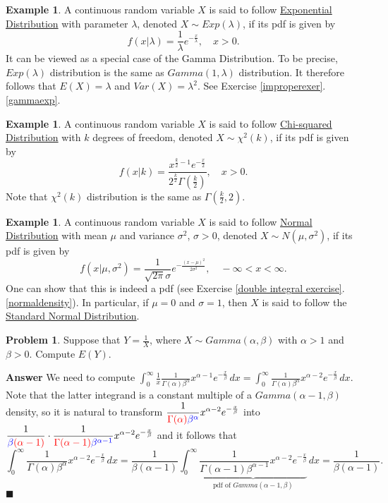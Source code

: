 \documentclass[12pt,letterpaper]{book}
\def\red{\textcolor{red}}
\def\blue{\textcolor{blue}}
\numberwithin{equation}{section}
\theoremstyle{definition}
\newtheorem{problem}[thm]{\textbf{Problem}}
\newtheorem{example}[thm]{\textbf{Example}}
\newenvironment{answer}{\noindent\textbf{Answer}}{\hfill$\blacksquare$\vspace{0.1in}}
\begin{document}
\begin{example} \label{def of exp dist}
A continuous random variable $X$ is said to follow \underline{Exponential Distribution} with parameter $\lambda$, denoted $X\sim Exp(\lambda)$, if its pdf is given by
$$f(x|\lambda)=\frac{1}{\lambda} e^{-\frac{x}{\lambda}},\quad x>0.$$
It can be viewed as a special case of the Gamma Distribution. To be precise, $Exp(\lambda)$ distribution is the same as $Gamma(1,\lambda)$ distribution. It therefore follows that $E(X)=\lambda$ and $Var(X)=\lambda^2$. See Exercise \ref{improperexer}.\ref{gammaexp}.
\end{example}

\begin{example}
A continuous random variable $X$ is said to follow \underline{Chi-squared Distribution} with $k$ degrees of freedom, denoted $X\sim \chi^2(k)$, if its pdf is given by
$$f(x|k)=\frac{x^{\frac{k}{2}-1}e^{-\frac{x}{2}}}{2^\frac{k}{2}\Gamma(\frac{k}{2})},\quad x>0.$$
Note that $\chi^2(k)$ distribution is the same as $\Gamma(\frac{k}{2},2)$.
\end{example}

\begin{example} A continuous random variable $X$ is said to follow \underline{Normal Distribution} with mean $\mu$ and variance $\sigma^2$, $\sigma>0$, denoted $X\sim N(\mu,\sigma^2)$, if its pdf is given by $$f(x|\mu,\sigma^2)=\frac{1}{\sqrt{2\pi}\sigma}e^{-\frac{(x-\mu)^2}{2\sigma^2}},\quad -\infty<x<\infty.$$
One can show that this is indeed a pdf (see Exercise \ref{double integral exercise}.\ref{normaldensity}). In particular, if $\mu=0$ and $\sigma=1$, then $X$ is said to follow the \underline{Standard Normal Distribution}.
\end{example}

\begin{problem}
Suppose that $Y=\frac{1}{X}$, where $X\sim Gamma(\alpha,\beta)$ with $\alpha>1$ and $\beta>0$. Compute $E(Y)$.
\end{problem}

\begin{answer}
We need to compute $\displaystyle{\int_0^\infty \frac{1}{x}\frac{1}{\Gamma(\alpha)\beta^\alpha}x^{\alpha-1}e^{-\frac{x}{\beta}}\,dx=\int_0^\infty \frac{1}{\Gamma(\alpha)\beta^\alpha}x^{\alpha-2}e^{-\frac{x}{\beta}}\,dx}$. Note that the latter integrand is a constant multiple of a $Gamma(\alpha-1,\beta)$ density, so it is natural to transform
$\displaystyle{\frac{1}{\red{\Gamma(\alpha)}\blue{\beta^\alpha}}x^{\alpha-2}e^{-\frac{x}{\beta}}}$ into $\displaystyle{\frac{1}{\blue{\beta}\red{(\alpha-1)}}\cdot\frac{1}{\red{\Gamma(\alpha-1)}\blue{\beta^{\alpha-1}}}x^{\alpha-2}e^{-\frac{x}{\beta}}}$ and it follows that
$$\int_0^\infty \frac{1}{\Gamma(\alpha)\beta^\alpha}x^{\alpha-2}e^{-\frac{x}{\beta}}\,dx=\frac{1}{\beta(\alpha-1)}\int_0^\infty \underbrace{\frac{1}{\Gamma(\alpha-1)\beta^{\alpha-1}}x^{\alpha-2}e^{-\frac{x}{\beta}}}_{\text{pdf of }Gamma(\alpha-1,\beta)}\,dx=\frac{1}{\beta(\alpha-1)}.$$
\end{answer}
\end{document}
